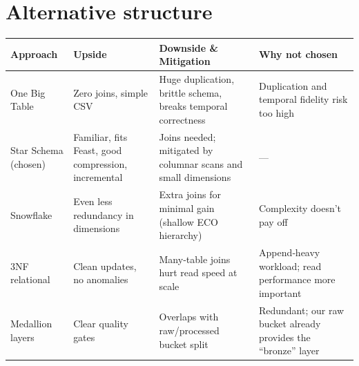 
\section{Alternative structure}
\begin{table}[htp!]
    \centering
    \begin{tabular}{|p{3cm}|p{3.5cm}|p{4.5cm}|p{3.5cm}|}
        \hline
        \textbf{Approach} & \textbf{Upside} & \textbf{Downside \& Mitigation} & \textbf{Why not chosen} \\ \hline
        One Big Table & Zero joins, simple CSV & Huge duplication, brittle schema, breaks temporal correctness & Duplication and temporal fidelity risk too high \\ \hline
        Star Schema (chosen) & Familiar, fits Feast, good compression, incremental & Joins needed; mitigated by columnar scans and small dimensions & --- \\ \hline
        Snowflake & Even less redundancy in dimensions & Extra joins for minimal gain (shallow ECO hierarchy) & Complexity doesn’t pay off \\ \hline
        3NF relational & Clean updates, no anomalies & Many‑table joins hurt read speed at scale & Append‑heavy workload; read performance more important \\ \hline
        Medallion layers & Clear quality gates & Overlaps with raw/processed bucket split & Redundant; our raw bucket already provides the “bronze” layer \\ \hline
    \end{tabular}
\end{table}


